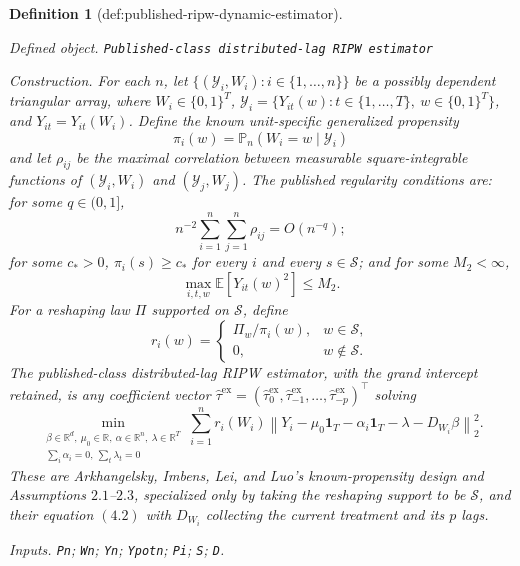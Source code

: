 \documentclass{article}
\newtheorem{definition}{Definition}
\begin{document}
\begin{definition}[def:published-ripw-dynamic-estimator]\label{def:published-ripw-dynamic-estimator}
\par\smallskip\noindent\emph{Defined object.} \texttt{Published-\allowbreak{}class distributed-\allowbreak{}lag RIPW estimator}
\par\smallskip\noindent\emph{Construction.} For each \(n\), let \(\{(\mathscr Y_i,W_i):i\in\{1,\ldots,n\}\}\) be a possibly dependent triangular array, where \(W_i\in\{0,1\}^{T}\), \(\mathscr Y_i=\{Y_{it}(w):t\in\{1,\ldots,T\},\ w\in\{0,1\}^{T}\}\), and \(Y_{it}=Y_{it}(W_i)\).  Define the known unit-specific generalized propensity
\[
 \pi_i(w)=\mathbb P_n(W_i=w\mid\mathscr Y_i)
\]
and let \(\rho_{ij}\) be the maximal correlation between measurable square-integrable functions of \((\mathscr Y_i,W_i)\) and \((\mathscr Y_j,W_j)\).  The published regularity conditions are: for some \(q\in(0,1]\),
\[
 n^{-2}\sum_{i=1}^{n}\sum_{j=1}^{n}\rho_{ij}=O(n^{-q});
\]
for some \(c_{*}>0\), \(\pi_i(s)\geq c_{*}\) for every \(i\) and every \(s\in\mathcal S\); and for some \(M_{2}<\infty\),
\[
 \max_{i,t,w}\mathbb E[Y_{it}(w)^2]\leq M_{2}.
\]
For a reshaping law \(\Pi\) supported on \(\mathcal S\), define
\[
 r_i(w)=
 \begin{cases}
 \Pi_w/\pi_i(w),&w\in\mathcal S,\\
 0,&w\notin\mathcal S.
 \end{cases}
\]
The published-class distributed-lag RIPW estimator, with the grand intercept retained, is any coefficient vector \(\widehat\tau^{\mathrm{ex}}=(\widehat\tau^{\mathrm{ex}}_{0},\widehat\tau^{\mathrm{ex}}_{-1},\ldots,\widehat\tau^{\mathrm{ex}}_{-p})^{\top}\) solving
\[
 \min_{\substack{\beta\in\mathbb R^{d},\ \mu_0\in\mathbb R,\
                   \alpha\in\mathbb R^n,\ \lambda\in\mathbb R^T\\
                   \sum_i\alpha_i=0,\ \sum_t\lambda_t=0}}
 \sum_{i=1}^{n}r_i(W_i)
 \left\|Y_i-\mu_0\mathbf 1_T-\alpha_i\mathbf 1_T-\lambda-D_{W_i}\beta\right\|_2^2.
\]
These are Arkhangelsky, Imbens, Lei, and Luo's known-propensity design and Assumptions \(2.1\)--\(2.3\), specialized only by taking the reshaping support to be \(\mathcal S\), and their equation \((4.2)\) with \(D_{W_i}\) collecting the current treatment and its \(p\) lags.
\par\smallskip\noindent\emph{Inputs.} \texttt{Pn}; \texttt{Wn}; \texttt{Yn}; \texttt{Ypotn}; \texttt{Pi}; \texttt{S}; \texttt{D}.
\end{definition}
\end{document}

